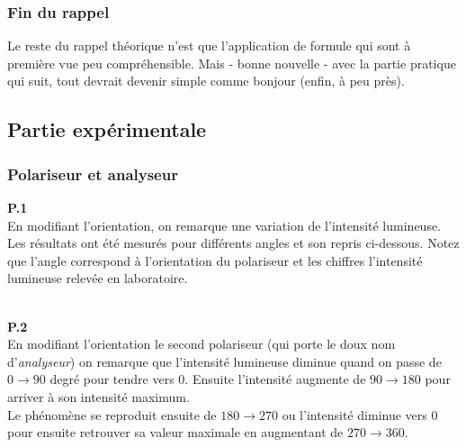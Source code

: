 \documentclass	[11pt, a4paper, openany]{book}
\begin{document}
\subsubsection*{Fin du rappel}
Le reste du rappel théorique n'est que l'application de formule qui sont à première vue peu compréhensible. Mais - bonne nouvelle - avec la partie pratique qui suit, tout devrait devenir simple comme bonjour (enfin, à peu près).

\subsection{Partie expérimentale}
\subsubsection*{Polariseur et analyseur}
\textbf{P.1}\\
En modifiant l'orientation, on remarque une variation de l'intensité lumineuse. Les résultats ont été mesurés pour différents angles et son repris ci-dessous. Notez que l'angle correspond à l'orientation du polariseur et les chiffres l'intensité lumineuse relevée en laboratoire.
\begin{center}
\end{center}
\ \\
\textbf{P.2}\\
En modifiant l'orientation le second polariseur (qui porte le doux nom d'\textit{analyseur}) on remarque que l'intensité lumineuse diminue quand on passe de $0 \rightarrow 90$ degré pour tendre vers 0. Ensuite l'intensité augmente de $90 \rightarrow 180$ pour arriver à son intensité maximum.\\
Le phénomène se reproduit ensuite de $180 \rightarrow 270$ ou l'intensité diminue vers 0 pour ensuite retrouver sa valeur maximale en augmentant de $270 \rightarrow 360$.\\
\end{document}
